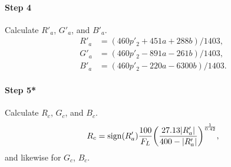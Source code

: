 \documentclass[twocolumn]{scrartcl}
\DeclarePairedDelimiter\abs{\lvert}{\rvert}%
\DeclareMathOperator{\sign}{sign}
\begin{document}
\paragraph{Step 4}{%
  Calculate $R'_a$, $G'_a$, and $B'_a$.
  \begin{align*}
    R'_a &= (460 p'_2 + 451 a + 288 b) / 1403,\\
    G'_a &= (460 p'_2 - 891 a - 261 b) / 1403,\\
    B'_a &= (460 p'_2 - 220 a - 6300 b) / 1403.
  \end{align*}%
  }

\paragraph{Step 5*}{%
  Calculate $R_c$, $G_c$, and $B_c$.
  \[
    R_c = \sign(R'_a) \frac{100}{F_L} {\left(\frac{27.13 \abs{R'_a}}{400 - \abs{R'_a}}\right)}^{\frac{1}{0.42}},
  \]
and likewise for $G_c$, $B_c$.}





%
%
%
%
%
%
%

\printbibliography
\end{document}
